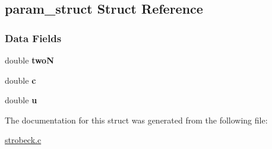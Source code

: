 \hypertarget{structparam__struct}{\subsection{param\-\_\-struct \-Struct \-Reference}
\label{structparam__struct}
}
\subsubsection*{\-Data \-Fields}
\begin{DoxyCompactItemize}
\item 
\hypertarget{structparam__struct_aa95786d09b8170f34cbe2fbbe043d217}{double {\bfseries two\-N}}\label{structparam__struct_aa95786d09b8170f34cbe2fbbe043d217}

\item 
\hypertarget{structparam__struct_ae5493bea2e917530ac906a7dfb53fc5f}{double {\bfseries c}}\label{structparam__struct_ae5493bea2e917530ac906a7dfb53fc5f}

\item 
\hypertarget{structparam__struct_a7f2b2a3750829b579aece4ea74d7fdb2}{double {\bfseries u}}\label{structparam__struct_a7f2b2a3750829b579aece4ea74d7fdb2}

\end{DoxyCompactItemize}


\-The documentation for this struct was generated from the following file\-:\begin{DoxyCompactItemize}
\item 
\hyperlink{strobeck_8c}{strobeck.\-c}\end{DoxyCompactItemize}
